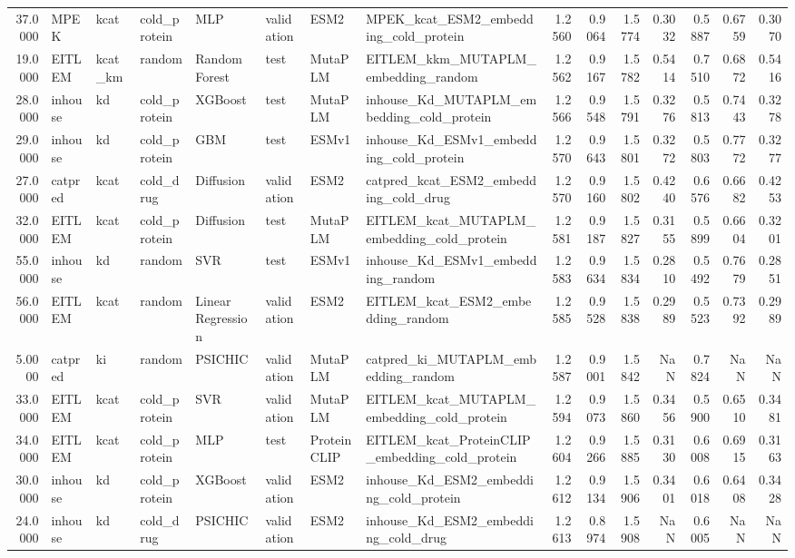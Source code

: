 \begin{tabular}{rlllllllrrrrrrr}
37.0000 & MPEK & kcat & cold_protein & MLP & validation & ESM2 & MPEK_kcat_ESM2_embedding_cold_protein & 1.2560 & 0.9064 & 1.5774 & 0.3032 & 0.5887 & 0.6759 & 0.3070 \\
19.0000 & EITLEM & kcat_km & random & Random Forest & test & MutaPLM & EITLEM_kkm_MUTAPLM_embedding_random & 1.2562 & 0.9167 & 1.5782 & 0.5414 & 0.7510 & 0.6872 & 0.5416 \\
28.0000 & inhouse & kd & cold_protein & XGBoost & test & MutaPLM & inhouse_Kd_MUTAPLM_embedding_cold_protein & 1.2566 & 0.9548 & 1.5791 & 0.3276 & 0.5813 & 0.7443 & 0.3278 \\
29.0000 & inhouse & kd & cold_protein & GBM & test & ESMv1 & inhouse_Kd_ESMv1_embedding_cold_protein & 1.2570 & 0.9643 & 1.5801 & 0.3272 & 0.5803 & 0.7772 & 0.3277 \\
27.0000 & catpred & kcat & cold_drug & Diffusion & validation & ESM2 & catpred_kcat_ESM2_embedding_cold_drug & 1.2570 & 0.9160 & 1.5802 & 0.4240 & 0.6576 & 0.6682 & 0.4253 \\
32.0000 & EITLEM & kcat & cold_protein & Diffusion & test & MutaPLM & EITLEM_kcat_MUTAPLM_embedding_cold_protein & 1.2581 & 0.9187 & 1.5827 & 0.3155 & 0.5899 & 0.6604 & 0.3201 \\
55.0000 & inhouse & kd & random & SVR & test & ESMv1 & inhouse_Kd_ESMv1_embedding_random & 1.2583 & 0.9634 & 1.5834 & 0.2810 & 0.5492 & 0.7679 & 0.2851 \\
56.0000 & EITLEM & kcat & random & Linear Regression & validation & ESM2 & EITLEM_kcat_ESM2_embedding_random & 1.2585 & 0.9528 & 1.5838 & 0.2989 & 0.5523 & 0.7392 & 0.2989 \\
5.0000 & catpred & ki & random & PSICHIC & validation & MutaPLM & catpred_ki_MUTAPLM_embedding_random & 1.2587 & 0.9001 & 1.5842 & NaN & 0.7824 & NaN & NaN \\
33.0000 & EITLEM & kcat & cold_protein & SVR & validation & MutaPLM & EITLEM_kcat_MUTAPLM_embedding_cold_protein & 1.2594 & 0.9073 & 1.5860 & 0.3456 & 0.5900 & 0.6510 & 0.3481 \\
34.0000 & EITLEM & kcat & cold_protein & MLP & test & ProteinCLIP & EITLEM_kcat_ProteinCLIP_embedding_cold_protein & 1.2604 & 0.9266 & 1.5885 & 0.3130 & 0.6008 & 0.6915 & 0.3163 \\
30.0000 & inhouse & kd & cold_protein & XGBoost & validation & ESM2 & inhouse_Kd_ESM2_embedding_cold_protein & 1.2612 & 0.9134 & 1.5906 & 0.3401 & 0.6018 & 0.6408 & 0.3428 \\
24.0000 & inhouse & kd & cold_drug & PSICHIC & validation & ESM2 & inhouse_Kd_ESM2_embedding_cold_drug & 1.2613 & 0.8974 & 1.5908 & NaN & 0.6005 & NaN & NaN \\

\end{tabular}
